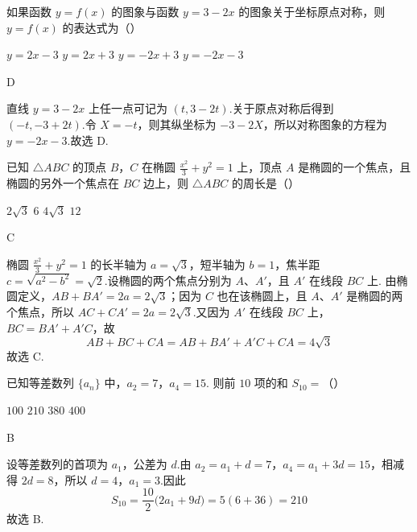 \begin{problem}
如果函数 \( y = f(x) \) 的图象与函数 \( y = 3 - 2x \) 的图象关于坐标原点对称，则 \( y = f(x) \) 的表达式为（\quad）

\choices
    {\(y = 2x - 3\)}
    {\(y = 2x + 3\)}
    {\( y = -2x + 3 \)}
    {\(y = -2x - 3\)}
\end{problem}

\begin{answer}
D
\end{answer}

\begin{solution}
直线 \(y=3-2x\) 上任一点可记为 \((t,3-2t)\).关于原点对称后得到
\((-t,-3+2t)\).令 \(X=-t\)，则其纵坐标为 \(-3-2X\)，所以对称图象的方程为
\(y=-2x-3\).故选 D.
\end{solution}

\begin{problem}
已知 \(\triangle ABC\) 的顶点 \(B\)，\(C\) 在椭圆 \(\frac{x^2}{3} + y^2 = 1\) 上，顶点 \(A\) 是椭圆的一个焦点，且椭圆的另外一个焦点在 \(BC\) 边上，则 \(\triangle ABC\) 的周长是（\quad）

\choices
    {\(2\sqrt{3}\)}
    {\(6\)}
    {\( 4\sqrt{3} \)}
    {\(12\)}
\end{problem}

\begin{answer}
C
\end{answer}

\begin{solution}
椭圆 \(\frac{x^{2}}{3}+y^{2}=1\) 的长半轴为 \(a=\sqrt3\)，短半轴为 \(b=1\)，焦半距
\(c=\sqrt{a^{2}-b^{2}}=\sqrt2\).设椭圆的两个焦点分别为 \(A\)、\(A'\)，且 \(A'\) 在线段 \(BC\) 上.
由椭圆定义，\(AB+BA'=2a=2\sqrt3\)；因为 \(C\) 也在该椭圆上，且 \(A\)、\(A'\) 是椭圆的两个焦点，所以 \(AC+CA'=2a=2\sqrt3\).又因为 \(A'\) 在线段 \(BC\) 上，\(BC=BA'+A'C\)，故
\[
AB+BC+CA=AB+BA'+A'C+CA=4\sqrt3
\]
故选 C.
\end{solution}

\begin{problem}
已知等差数列 \(\{a_{n}\}\) 中，\(a_{2} = 7\)，\(a_{4} = 15\). 则前 \(10\) 项的和 \(S_{10} =\)（\quad）

\choices
    {\(100\)}
    {\(210\)}
    {\(380\)}
    {\(400\)}
\end{problem}

\begin{answer}
B
\end{answer}

\begin{solution}
设等差数列的首项为 \(a_{1}\)，公差为 \(d\).由
\(a_{2}=a_{1}+d=7\)，\(a_{4}=a_{1}+3d=15\)，相减得 \(2d=8\)，所以 \(d=4\)，\(a_{1}=3\).因此
\[
S_{10}=\frac{10}{2}\bigl(2a_{1}+9d\bigr)=5(6+36)=210
\]
故选 B.
\end{solution}

